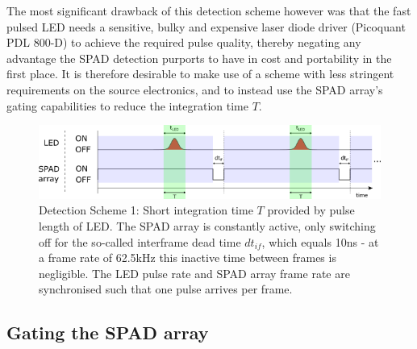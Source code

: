 \documentclass[]{article}
\begin{document}
	The most significant drawback of this detection scheme however was that the fast pulsed LED needs a sensitive, bulky and expensive laser diode driver (Picoquant PDL 800-D) to achieve the required pulse quality, thereby negating any advantage the SPAD detection purports to have in cost and portability in the first place. It is therefore desirable to make use of a scheme with less stringent requirements on the source electronics, and to instead use the SPAD array's gating capabilities to reduce the integration time $T$.
	
		\begin{figure}
			\centering
			\includegraphics[width=0.8\linewidth]{Figures/detectionScheme1}
			\caption{Detection Scheme 1: Short integration time $T$ provided by pulse length of LED. The SPAD array is constantly active, only switching off for the so-called interframe dead time $dt_{if}$, which equals 10ns - at a frame rate of 62.5kHz this inactive time between frames is negligible. The LED pulse rate and SPAD array frame rate are synchronised such that one pulse arrives per frame.}
			\label{fig:detectionscheme1}
		\end{figure}
		
\subsection{Gating the SPAD array}
	
	
\clearpage


\end{document}

